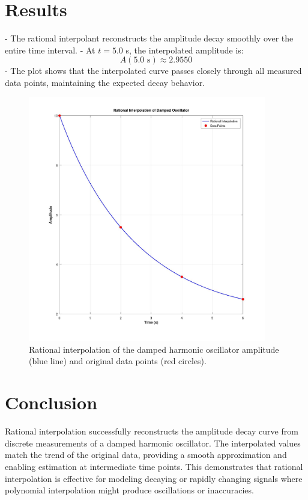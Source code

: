 \section*{Results}
- The rational interpolant reconstructs the amplitude decay smoothly over the entire time interval.
- At \(t = 5.0\) s, the interpolated amplitude is:
\[
A(5.0 \text{ s}) \approx 2.9550
\]
- The plot shows that the interpolated curve passes closely through all measured data points, maintaining the expected decay behavior.

\begin{figure}[h!]
  \centering
  \includegraphics[width=0.93\textwidth]{a2.jpg}
  \caption{Rational interpolation of the damped harmonic oscillator amplitude (blue line) and original data points (red circles).}
\end{figure}

\section*{Conclusion}
Rational interpolation successfully reconstructs the amplitude decay curve from discrete measurements of a damped harmonic oscillator. The interpolated values match the trend of the original data, providing a smooth approximation and enabling estimation at intermediate time points. This demonstrates that rational interpolation is effective for modeling decaying or rapidly changing signals where polynomial interpolation might produce oscillations or inaccuracies.
